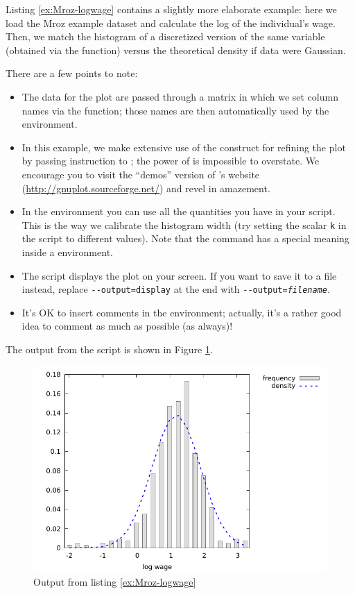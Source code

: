 Listing \ref{ex:Mroz-logwage} contains a slightly more elaborate
example: here we load the Mroz example dataset and calculate the log
of the individual's wage. Then, we match the histogram of a
discretized version of the same variable (obtained via the
 function) versus the theoretical density if data
were Gaussian.

There are a few points to note:
\begin{itemize}
\item The data for the plot are passed through a matrix in which we
  set column names via the  function; those names are
  then automatically used by the  environment.
\item In this example, we make extensive use of the 
  construct for refining the plot by passing instruction to
  ; the power of  is impossible to
  overstate. We encourage you to visit the ``demos'' version of
  's website (\url{http://gnuplot.sourceforge.net/}) and
  revel in amazement.
\item In the  environment you can use all the quantities you
  have in your script. This is the way we calibrate the histogram
  width (try setting the scalar \verb|k| in the script to different
  values). Note that the  command has a special meaning
  inside a  environment.
\item The script displays the plot on your screen. If you want to save
  it to a file instead, replace \verb!--output=display! at the end
  with \texttt{-{}-output=\textsl{filename}}.
\item It's OK to insert comments in the  environment;
  actually, it's a rather good idea to comment as much as possible (as
  always)!
\end{itemize}
The output from the script is shown in Figure \ref{fig:Mroz-logwage}.


\begin{figure}[htbp]
  \centering
  \includegraphics{figures/Mroz-logwage}
  \caption{Output from listing \ref{ex:Mroz-logwage}}
  \label{fig:Mroz-logwage}
\end{figure}

